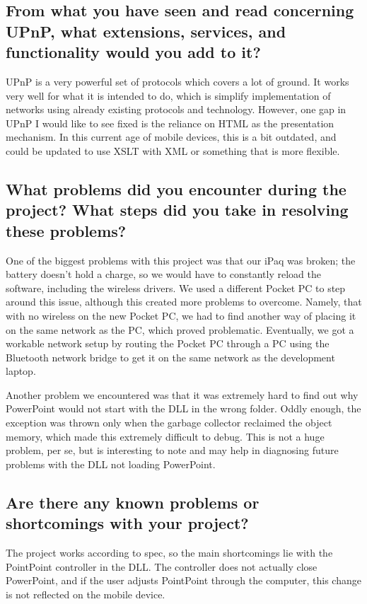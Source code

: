 \documentclass[11pt]{report}
\begin{document}
\subsection{From what you have seen and read concerning UPnP, what extensions, services, and functionality would you add to it?}

UPnP is a very powerful set of protocols which covers a lot of ground. It works very well for what it is intended to do, which is simplify implementation of networks using already existing protocols and technology. However, one gap in UPnP I would like to see fixed is the reliance on HTML as the presentation mechanism. In this current age of mobile devices, this is a bit outdated, and could be updated to use XSLT with XML or something that is more flexible.

\subsection{What problems did you encounter during the project?  What steps did you take in resolving these problems?}

One of the biggest problems with this project was that our iPaq was broken; the battery doesn't hold a charge, so we would have to constantly reload the software, including the wireless drivers. We used a different Pocket PC to step around this issue, although this created more problems to overcome. Namely, that with no wireless on the new Pocket PC, we had to find another way of placing it on the same network as the PC, which proved problematic. Eventually, we got a workable network setup by routing the Pocket PC through a PC using the Bluetooth network bridge to get it on the same network as the development laptop.

Another problem we encountered was that it was extremely hard to find out why PowerPoint would not start with the DLL in the wrong folder. Oddly enough, the exception was thrown only when the garbage collector reclaimed the object memory, which made this extremely difficult to debug. This is not a huge problem, per se, but is interesting to note and may help in diagnosing future problems with the DLL not loading PowerPoint.

\subsection{Are there any known problems or shortcomings with your project?}

The project works according to spec, so the main shortcomings lie with the PointPoint controller in the DLL. The controller does not actually close PowerPoint, and if the user adjusts PointPoint through the computer, this change is not reflected on the mobile device.
\end{document}
